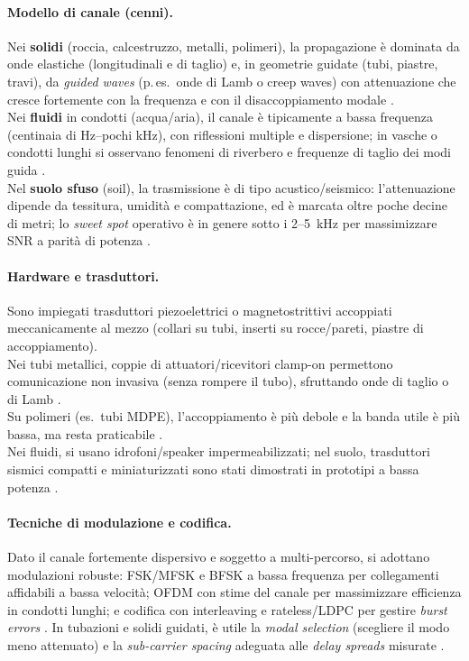 \paragraph{Modello di canale (cenni).}
Nei \textbf{solidi} (roccia, calcestruzzo, metalli, polimeri), la propagazione è dominata da onde elastiche (longitudinali e di taglio) e, in geometrie guidate 
(tubi, piastre, travi), da \emph{guided waves} (p.\,es.\ onde di Lamb o creep waves) con attenuazione che cresce fortemente con la frequenza e 
con il disaccoppiamento modale \citep{heifetz2020shear}.\\ Nei \textbf{fluidi} in condotti (acqua/aria), il canale è tipicamente 
a bassa frequenza (centinaia di Hz–pochi kHz), con riflessioni multiple e dispersione; in vasche o condotti lunghi si osservano fenomeni di riverbero 
e frequenze di taglio dei modi guida \citep{fishta2023inpipe}. \\Nel \textbf{suolo sfuso} (soil), la trasmissione è di tipo acustico/seismico: 
l’attenuazione dipende da tessitura, umidità e compattazione, ed è marcata oltre poche decine di metri; lo \emph{sweet spot} operativo è in genere 
sotto i 2–5~kHz per massimizzare SNR a parità di potenza \citep{yang2020soil,raza2020wuc}.

\paragraph{Hardware e trasduttori.}
Sono impiegati trasduttori piezoelettrici o magnetostrittivi accoppiati meccanicamente al mezzo (collari su tubi, inserti su rocce/pareti, piastre di accoppiamento).\\
 Nei tubi metallici, coppie di attuatori/ricevitori clamp-on permettono comunicazione non invasiva (senza rompere il tubo), sfruttando onde di taglio o di Lamb \citep{heifetz2017pipes,heifetz2020shear}.\\
  Su polimeri (es.\ tubi MDPE), l’accoppiamento è più debole e la banda utile è più bassa, ma resta praticabile \citep{farai2023mdpe}. \\
  Nei fluidi, si usano idrofoni/speaker impermeabilizzati; nel suolo, trasduttori sismici compatti e miniaturizzati sono stati dimostrati in prototipi a bassa potenza \citep{yang2020soil}.

\paragraph{Tecniche di modulazione e codifica.}
Dato il canale fortemente dispersivo e soggetto a multi-percorso, si adottano modulazioni robuste:
FSK/MFSK e BFSK a bassa frequenza per collegamenti affidabili a bassa velocità; OFDM con stime del canale per massimizzare efficienza in condotti lunghi; e codifica con interleaving e rateless/LDPC per gestire \emph{burst errors} \citep{fishta2023inpipe,farai2023mdpe}. In tubazioni e solidi guidati, è utile la \emph{modal selection} (scegliere il modo meno attenuato) e la \emph{sub-carrier spacing} adeguata alle \emph{delay spreads} misurate \citep{heifetz2020shear,farai2023mdpe}.

